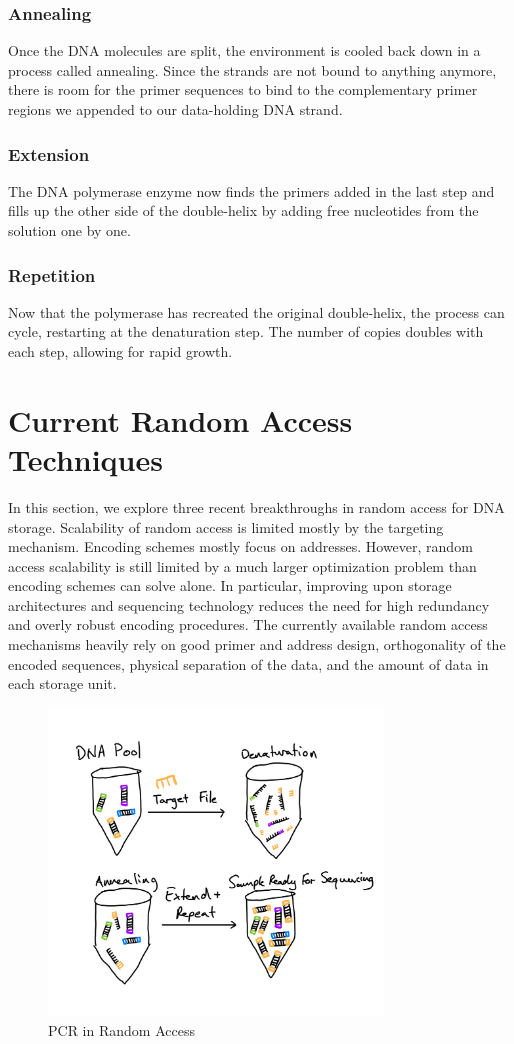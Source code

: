 \documentclass[a4paper,conference]{IEEEtran}
\begin{document}
\subsubsection{Annealing}
Once the DNA molecules are split, the environment is cooled back down in a process called annealing. Since the strands are not bound to anything anymore, there is room for the primer sequences to bind to the complementary primer regions we appended to our data-holding DNA strand.

\subsubsection{Extension}
The DNA polymerase enzyme now finds the primers added in the last step and fills up the other side of the double-helix by adding free nucleotides from the solution one by one.

\subsubsection{Repetition}
Now that the polymerase has recreated the original double-helix, the process can cycle, restarting at the denaturation step. The number of copies doubles with each step, allowing for rapid growth.

\section{Current Random Access Techniques}
In this section, we explore three recent breakthroughs in random access for DNA storage. 
Scalability of random access is limited mostly by the targeting mechanism. Encoding schemes mostly focus on addresses. However, random access scalability is still limited by a much larger optimization problem than encoding schemes can solve alone. In particular, improving upon storage architectures and sequencing technology reduces the need for high redundancy and overly robust encoding procedures. The currently available random access mechanisms heavily rely on good primer and address design, orthogonality of the encoded sequences, physical separation of the data, and the amount of data in each storage unit.


\begin{figure}[!t]
\centering
\includegraphics[width=3.5in]{pcrRA}
\caption{PCR in Random Access}
\label{fig_sim}
\end{figure}
\end{document}
